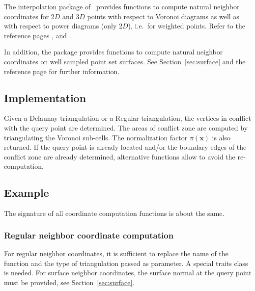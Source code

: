   The interpolation package of \cgal\ provides functions to compute
  natural neighbor coordinates for $2D$ and $3D$ points with respect
  to Voronoi diagrams as well as with respect to power diagrams (only
  $2D$), i.e.\ for weighted points. Refer to the reference pages
  ,
   and
  .
  
  In addition, the package provides functions to compute natural
  neighbor coordinates on well sampled point set surfaces. See
  Section~\ref{sec:surface} and the reference page
   for further information.

\subsection{Implementation}
Given a Delaunay triangulation or a Regular triangulation, the
vertices in conflict with the query point are determined. The areas of
conflict zone are computed by triangulating the Voronoi sub-cells. The
normalization factor $\pi(\mathbf{x})$ is also returned. If the query
point is already located and/or the boundary edges of the conflict
zone are already determined, alternative functions allow to avoid the
re-computation.

\subsection{Example}
The signature of all coordinate computation functions is about the
same.
\subsubsection{Regular neighbor coordinate computation}
For regular neighbor coordinates, it is sufficient to replace the name
of the function and the type of triangulation passed as parameter. A
special traits class is needed.
For surface neighbor coordinates, the surface normal at the query
point must be provided, see Section~\ref{sec:surface}.
%
